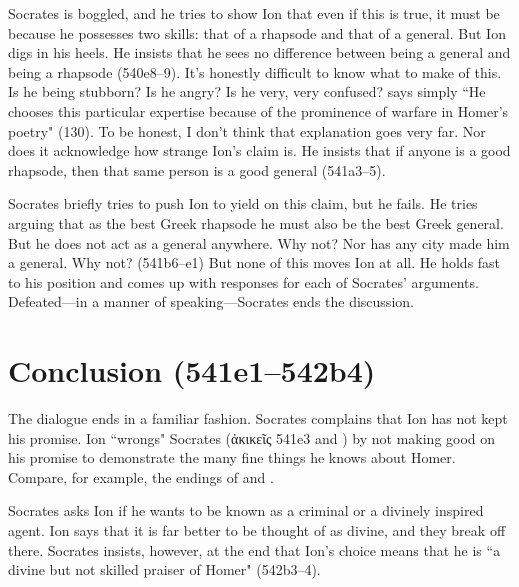 \documentclass[11pt]{article}
\begin{document}
Socrates is boggled, and he tries to show Ion that even if this is true, it
must be because he possesses two skills: that of a rhapsode and that of
a general.  But Ion digs in his heels. He insists that he sees no
difference between being a general and being a rhapsode (540e8--9).  It's
honestly difficult to know what to make of this.  Is he being stubborn?  Is
he angry?  Is he very, very confused? \citet{murray1996} says simply ``He
chooses this particular expertise because of the prominence of warfare in
Homer's poetry" (130).  To be honest, I don't think that explanation goes
very far.  Nor does it acknowledge how strange Ion's claim is.  He insists
that if anyone is a good rhapsode, then that same person is  a good general (541a3--5).

Socrates briefly tries to push Ion to yield on this claim, but he fails.
He tries arguing that as the best Greek rhapsode he must also be the best
Greek general.  But he does not act as a general anywhere.  Why not?  Nor
has any city made him a general.  Why not? (541b6--e1)  But none of this
moves Ion at all.  He holds fast to his position and comes up with
 responses for each of Socrates' arguments.  Defeated---in
a manner of speaking---Socrates ends the discussion.


\section{Conclusion (541e1--542b4)}

The dialogue ends in a familiar fashion.  Socrates complains that Ion has
not kept his promise.  Ion ``wrongs" Socrates ({\g ἀκικεῖς} 541e3 and
) by not making good on his promise to demonstrate the many
fine things he knows about Homer.  Compare, for example, the endings of
 and .

Socrates asks Ion if he wants to be known as a criminal or a divinely
inspired agent.  Ion says that it is far better to be thought of as divine,
and they break off there.  Socrates insists, however, at the end that Ion's
choice means that he is ``a divine but not skilled praiser of Homer"
(542b3--4).


\newpage


\end{document}
